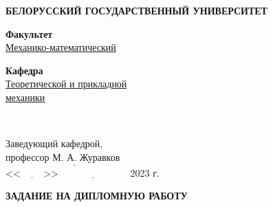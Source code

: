 \documentclass[a4paper]{extreport}
\begin{document}
	\begin{center}
		\textbf{БЕЛОРУССКИЙ ГОСУДАРСТВЕННЫЙ УНИВЕРСИТЕТ\\}
	\end{center}
	\begin{minipage}{0.4\textwidth}
		\textbf{Факультет}\\
		\underline{Механико-математический}\\
	\end{minipage}
	\hfill
	\begin{minipage}{0.4\textwidth}
		\textbf{Кафедра}\\
		\underline{Теоретической и прикладной}\\
		\underline{механики}
	\end{minipage}
	\\
	\begin{flushleft}
		Заведующий кафедрой,\\
		профессор М. А. Журавков\\
		$\underline{\hspace{6cm}}$\\
		<<$\underline{\hspace{1cm}}$>>$\underline{\hspace{3cm}}$ 2023 г.
	\end{flushleft}
	\begin{center}
		\textbf{\MakeUppercase{задание на дипломную работу}}
	\end{center}
\end{document}
